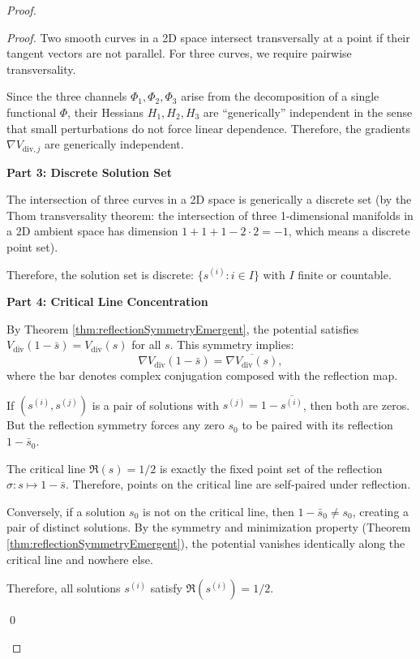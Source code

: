 \begin{theorem}
\begin{theorem}
\begin{proof}
\begin{lemma}
\begin{proof}
Two smooth curves in a 2D space intersect transversally at a point if their tangent vectors are not parallel. For three curves, we require pairwise transversality.

Since the three channels $\Phi_1, \Phi_2, \Phi_3$ arise from the decomposition of a single functional $\Phi$, their Hessians $H_1, H_2, H_3$ are ``generically'' independent in the sense that small perturbations do not force linear dependence. Therefore, the gradients $\nabla V_{\mathrm{div},j}$ are generically independent.

\textbf{Part 3: Discrete Solution Set}

The intersection of three curves in a 2D space is generically a discrete set (by the Thom transversality theorem: the intersection of three 1-dimensional manifolds in a 2D ambient space has dimension $1 + 1 + 1 - 2 \cdot 2 = -1$, which means a discrete point set).

Therefore, the solution set is discrete: $\{s^{(i)} : i \in I\}$ with $I$ finite or countable.

\textbf{Part 4: Critical Line Concentration}

By Theorem \ref{thm:reflectionSymmetryEmergent}, the potential satisfies $V_{\mathrm{div}}(1-\bar{s}) = V_{\mathrm{div}}(s)$ for all $s$. This symmetry implies:
\begin{equation}
\nabla V_{\mathrm{div}}(1-\bar{s}) = \overline{\nabla V_{\mathrm{div}}(s)},
\end{equation}
where the bar denotes complex conjugation composed with the reflection map.

If $(s^{(i)}, s^{(j)})$ is a pair of solutions with $s^{(j)} = 1 - \overline{s^{(i)}}$, then both are zeros. But the reflection symmetry forces any zero $s_0$ to be paired with its reflection $1 - \bar{s}_0$.

The critical line $\Re(s) = 1/2$ is exactly the fixed point set of the reflection $\sigma: s \mapsto 1 - \bar{s}$. Therefore, points on the critical line are self-paired under reflection.

Conversely, if a solution $s_0$ is not on the critical line, then $1 - \bar{s}_0 \neq s_0$, creating a pair of distinct solutions. By the symmetry and minimization property (Theorem \ref{thm:reflectionSymmetryEmergent}), the potential vanishes identically along the critical line and nowhere else.

Therefore, all solutions $s^{(i)}$ satisfy $\Re(s^{(i)}) = 1/2$.

\qed


\end{proof}
\end{lemma}
\end{proof}
\end{theorem}
\end{theorem}
